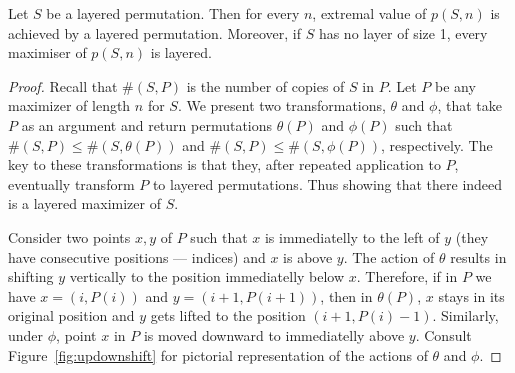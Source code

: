 \documentclass[12pt, a4paper, twoside]{report}
\begin{document}
\begin{theorem}
\label{thm:layered}
Let $S$ be a layered permutation. Then for every $n$, extremal value of $p(S,n)$ is achieved by a layered permutation. Moreover, if $S$ has no layer of size 1, every maximiser of $p(S,n)$ is layered.
\end{theorem}
\begin{proof}
Recall that $\#(S,P)$ is the number of copies of $S$ in $P$. Let $P$ be any maximizer of length $n$ for $S$. We present two transformations, $\theta$ and $\phi$, that take $P$ as an argument and return permutations $\theta(P)$ and $\phi(P)$ such that $\#(S,P) \leq \#(S,\theta(P))$ and $\#(S,P) \leq \#(S,\phi(P))$, respectively. The key to these transformations is that they, after repeated application to $P$, eventually transform $P$ to layered permutations. Thus showing that there indeed is a layered maximizer of $S$.

Consider two points $x,y$ of $P$ such that $x$ is immediatelly to the left of $y$ (they have consecutive positions --- indices) and $x$ is above $y$. The action of $\theta$ results in shifting $y$ vertically to the position immediatelly below $x$. Therefore, if in $P$ we have $x = (i,P(i))$ and $y = (i+1,P(i+1))$, then in $\theta(P)$, $x$ stays in its original position and $y$ gets lifted to the position $(i+1, P(i)-1)$. Similarly, under $\phi$, point $x$ in $P$ is moved downward to immediatelly above $y$. Consult Figure~\ref{fig:updownshift} for pictorial representation of the actions of $\theta$ and $\phi$. 


\end{proof}
\end{document}

